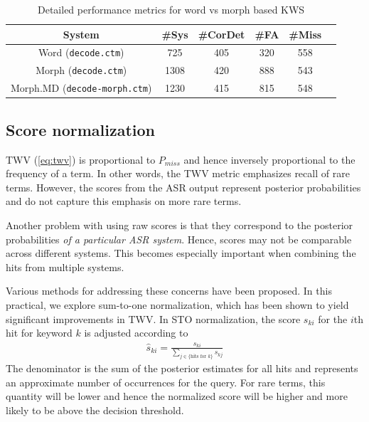 \documentclass[a4paper,oneside,reqno]{amsart}
\begin{document}
\begin{table}
  \begin{tabular}{cccccc}
    \toprule
    System                            & \#Sys & \#CorDet & \#FA & \#Miss\\
    \midrule
    Word (\texttt{decode.ctm})        & 725   & 405      & 320  & 558\\
    Morph (\texttt{decode.ctm})       & 1308  & 420      & 888  & 543\\
    Morph.MD (\texttt{decode-morph.ctm}) & 1230  & 415      & 815  & 548\\
    \bottomrule
  \end{tabular}
  \caption{Detailed performance metrics for word vs morph based KWS}
  \label{tab:morph-word-perf}
\end{table}

\subsection{Score normalization}

TWV (\autoref{eq:twv}) is proportional to $P_{miss}$ and hence inversely
proportional to the frequency of a term. In other words, the TWV metric
emphasizes recall of rare terms\cite{mamou2013system}. However, the scores
from the ASR output represent posterior probabilities and do not capture
this emphasis on more rare terms.

Another problem with using raw scores is that they correspond to the posterior
probabilities \emph{of a particular ASR system}. Hence, scores may not be
comparable across different systems. This becomes especially important when
combining the hits from multiple systems\cite{mamou2013system}.

Various methods for addressing these concerns have been proposed. In this practical,
we explore sum-to-one normalization, which has been shown to yield significant
improvements in TWV\cite{gales2014speech}. In STO normalization, the score
$s_{ki}$ for the $i$th hit for keyword $k$ is adjusted according to
\begin{align}
  \label{eq:sto}
  \hat{s}_{ki} = \frac{s_{ki}}{\sum_{j \in \{\text{hits for $k$}\}} s_{kj}}
\end{align}
The denominator is the sum of the posterior estimates for all hits and represents
an approximate number of occurrences for the query. For rare terms, this quantity
will be lower and hence the normalized score will be higher and more likely to be
above the decision threshold\cite{mamou2013system}.
\end{document}
